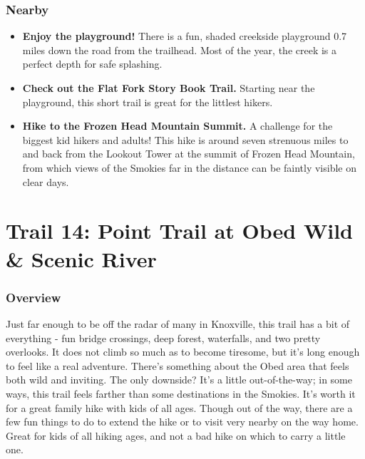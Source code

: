 \documentclass[
  letterpaper,
  DIV=11,
  numbers=noendperiod]{scrreprt}
\providecommand{\tightlist}{%
  \setlength{\itemsep}{0pt}\setlength{\parskip}{0pt}}\usepackage{longtable,booktabs,array}
\begin{document}
\subsection{Nearby}\label{nearby-12}

\begin{itemize}
\tightlist
\item
  \textbf{Enjoy the playground!} There is a fun, shaded creekside
  playground 0.7 miles down the road from the trailhead. Most of the
  year, the creek is a perfect depth for safe splashing.
\item
  \textbf{Check out the Flat Fork Story Book Trail.} Starting near the
  playground, this short trail is great for the littlest hikers.
\item
  \textbf{Hike to the Frozen Head Mountain Summit.} A challenge for the
  biggest kid hikers and adults! This hike is around seven strenuous
  miles to and back from the Lookout Tower at the summit of Frozen Head
  Mountain, from which views of the Smokies far in the distance can be
  faintly visible on clear days.
\end{itemize}

\chapter{Trail 14: Point Trail at Obed Wild \& Scenic
River}\label{trail-14-point-trail-at-obed-wild-scenic-river}

\subsection{Overview}\label{overview-14}

Just far enough to be off the radar of many in Knoxville, this trail has
a bit of everything - fun bridge crossings, deep forest, waterfalls, and
two pretty overlooks. It does not climb so much as to become tiresome,
but it's long enough to feel like a real adventure. There's something
about the Obed area that feels both wild and inviting. The only
downside? It's a little out-of-the-way; in some ways, this trail feels
farther than some destinations in the Smokies. It's worth it for a great
family hike with kids of all ages. Though out of the way, there are a
few fun things to do to extend the hike or to visit very nearby on the
way home. Great for kids of all hiking ages, and not a bad hike on which
to carry a little one.
\end{document}
